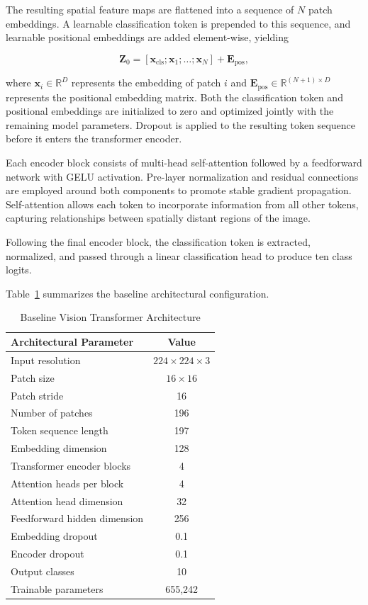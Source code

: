 \documentclass[conference]{IEEEtran}
\begin{document}
The resulting spatial feature maps are flattened into
a sequence of $N$ patch embeddings. A learnable
classification token is prepended to this sequence,
and learnable positional embeddings are added
element-wise, yielding

\begin{equation}
    \mathbf{Z}_0 =
    [\mathbf{x}_{\mathrm{cls}};
    \mathbf{x}_1;\ldots;\mathbf{x}_N]
    + \mathbf{E}_{\mathrm{pos}},
\end{equation}

where $\mathbf{x}_i \in \mathbb{R}^{D}$ represents
the embedding of patch $i$ and
$\mathbf{E}_{\mathrm{pos}} \in
\mathbb{R}^{(N+1)\times D}$ represents the positional
embedding matrix. Both the classification token and
positional embeddings are initialized to zero and
optimized jointly with the remaining model parameters.
Dropout is applied to the resulting token sequence
before it enters the transformer encoder.

Each encoder block consists of multi-head self-attention
followed by a feedforward network with GELU activation.
Pre-layer normalization and residual connections are
employed around both components to promote stable
gradient propagation. Self-attention allows each token
to incorporate information from all other tokens,
capturing relationships between spatially distant
regions of the image.

Following the final encoder block, the classification
token is extracted, normalized, and passed through
a linear classification head to produce ten class logits.

Table~\ref{tab:vit_architecture} summarizes the baseline
architectural configuration.

\begin{table}[htbp]
    \centering
    \caption{Baseline Vision Transformer Architecture}
    \label{tab:vit_architecture}
    \begin{tabular}{lc}
        \toprule
        Architectural Parameter & Value \\
        \midrule
        Input resolution & $224 \times 224 \times 3$ \\
        Patch size & $16 \times 16$ \\
        Patch stride & 16 \\
        Number of patches & 196 \\
        Token sequence length & 197 \\
        Embedding dimension & 128 \\
        Transformer encoder blocks & 4 \\
        Attention heads per block & 4 \\
        Attention head dimension & 32 \\
        Feedforward hidden dimension & 256 \\
        Embedding dropout & 0.1 \\
        Encoder dropout & 0.1 \\
        Output classes & 10 \\
        Trainable parameters & 655,242 \\
        \bottomrule
    \end{tabular}
\end{table}
\end{document}
